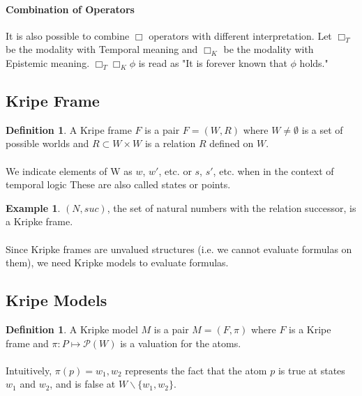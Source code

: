 \documentclass{article}
\theoremstyle{plain}
\theoremstyle{definition}
\newtheorem{defn}[thm]{Definition} %
\newtheorem{exmp}[thm]{Example} %
\begin{document}
\begin{multicols}{2}
\paragraph{Combination of Operators} It is also possible to combine $\Box$ operators with different interpretation. Let $\Box_T$ be the modality with Temporal meaning and $\Box_K$ be the modality with Epistemic meaning. $\Box_T\Box_K\phi$ is read as "It is forever known that $\phi$ holds."

\subsection{Kripe Frame}

\begin{defn}A Kripe frame $F$ is a pair $F = (W, R)$ where $W \neq \emptyset$ is a set of possible worlds and $R \subset W \times W$ is a relation $R$ defined on $W$.\end{defn}

\paragraph{} We indicate elements of W as $w$, $w'$, etc. or $s$, $s'$, etc. when in the context of temporal logic These are also called states or points.

\begin{exmp}$(N, suc)$, the set of natural numbers with the relation successor, is a Kripke frame.\end{exmp}

\paragraph{} Since Kripke frames are unvalued structures (i.e. we cannot evaluate formulas on them), we need Kripke models to evaluate formulas.

\subsection{Kripe Models}

\begin{defn}A Kripke model $M$ is a pair $M = (F, \pi)$ where $F$ is a Kripe frame and $\pi: P \mapsto \mathcal{P}(W)$ is a valuation for the atoms. \end{defn}

\paragraph{} Intuitively, $\pi(p)={w_1, w_2}$ represents the fact that the atom $p$ is true at states $w_1$ and $w_2$, and is false at $W \backslash \{w_1, w_2\}$. 


\end{multicols}
\end{document}
